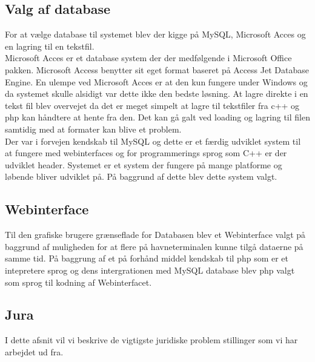 \subsection{Valg af database}
For at vælge database til systemet blev der kigge på MySQL, Microsoft Acces og en lagring til en tekstfil.\\
Microsoft Acces er et database system der der medfølgende i Microsoft Office pakken. Microsoft Access benytter sit eget format baseret på Access Jet Database Engine. En ulempe ved Microsoft Acces er at den kun fungere under Windows og da systemet skulle alsidigt var dette ikke den bedste løsning. At lagre direkte i en tekst fil blev overvejet da det er meget simpelt at lagre til tekstfiler fra c++ og php kan håndtere at hente fra den. Det kan gå galt ved loading og lagring til filen samtidig med at formater kan blive et problem. \\
Der var i forvejen kendskab til MySQL og dette er et færdig udviklet system til at fungere med webinterfaces og for programmerings sprog som C++ er der udviklet header. Systemet er et system der fungere på mange platforme og løbende bliver udviklet på. På baggrund af dette blev dette system valgt.

\subsection{Webinterface}
Til den grafiske brugere grænseflade for Databasen blev et Webinterface valgt på baggrund af muligheden for at flere på havneterminalen kunne tilgå dataerne på samme tid. På baggrung af et på forhånd middel kendskab til php som er et  intepretere sprog og dens intergrationen med MySQL database blev php valgt som sprog til kodning af Webinterfacet.

\subsection{Jura}
I dette afsnit vil vi beskrive de vigtigste juridiske problem stillinger som vi har arbejdet ud fra.

